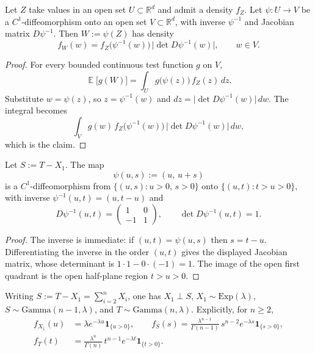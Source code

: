 \documentclass[11pt,a4paper]{article}
\DeclareMathOperator{\E}{\mathbb{E}}
\begin{document}
\begin{lemma}
\label{lem:p8-jac}
Let \(Z\) take values in an open set \(U\subset\mathbb{R}^d\) and admit a density \(f_Z\). Let \(\psi:U\to V\) be a \(C^1\)-diffeomorphism onto an open set \(V\subset\mathbb{R}^d\), with inverse \(\psi^{-1}\) and Jacobian matrix \(D\psi^{-1}\). Then \(W:=\psi(Z)\) has density
\[
f_W(w)
=
f_Z\bigl(\psi^{-1}(w)\bigr)\,
\bigl\lvert\det D\psi^{-1}(w)\bigr\rvert,
\qquad
w\in V.
\]
\end{lemma}

\begin{proof}
For every bounded continuous test function \(g\) on \(V\),
\[
\E\bigl[g(W)\bigr]
=
\int_U g\bigl(\psi(z)\bigr)\,f_Z(z)\,dz.
\]
Substitute \(w=\psi(z)\), so \(z=\psi^{-1}(w)\) and \(dz=\lvert\det D\psi^{-1}(w)\rvert\,dw\). The integral becomes
\[
\int_V g(w)\,f_Z\bigl(\psi^{-1}(w)\bigr)\,\lvert\det D\psi^{-1}(w)\rvert\,dw,
\]
which is the claim.
\end{proof}

\begin{lemma}
\label{lem:p8-sum-map}
Let \(S:=T-X_1\). The map
\[
\psi(u,s)
:=
(u,\,u+s)
\]
is a \(C^1\)-diffeomorphism from \(\{(u,s):u>0,\,s>0\}\) onto \(\{(u,t):t>u>0\}\), with inverse \(\psi^{-1}(u,t)=(u,t-u)\) and
\[
D\psi^{-1}(u,t)
=
\begin{pmatrix}
1 & 0 \\
-1 & 1
\end{pmatrix},
\qquad
\det D\psi^{-1}(u,t)
=
1.
\]
\end{lemma}

\begin{proof}
The inverse is immediate: if \((u,t)=\psi(u,s)\) then \(s=t-u\). Differentiating the inverse in the order \((u,t)\) gives the displayed Jacobian matrix, whose determinant is \(1\cdot 1-0\cdot(-1)=1\). The image of the open first quadrant is the open half-plane region \(t>u>0\).
\end{proof}

\begin{lemma}
\label{lem:p8-gamma-split}
Writing \(S:=T-X_1=\sum_{i=2}^n X_i\), one has \(X_1\perp S\), \(X_1\sim\mathrm{Exp}(\lambda)\), \(S\sim\mathrm{Gamma}(n-1,\lambda)\), and \(T\sim\mathrm{Gamma}(n,\lambda)\). Explicitly, for \(n\ge 2\),
\begin{align*}
f_{X_1}(u)
&=
\lambda e^{-\lambda u}\mathbf{1}_{\{u>0\}},
\qquad
f_S(s)
=
\frac{\lambda^{n-1}}{\Gamma(n-1)}\,s^{n-2}e^{-\lambda s}\mathbf{1}_{\{s>0\}},
\\
f_T(t)
&=
\frac{\lambda^n}{\Gamma(n)}\,t^{n-1}e^{-\lambda t}\mathbf{1}_{\{t>0\}}.
\end{align*}
\end{lemma}
\end{document}
